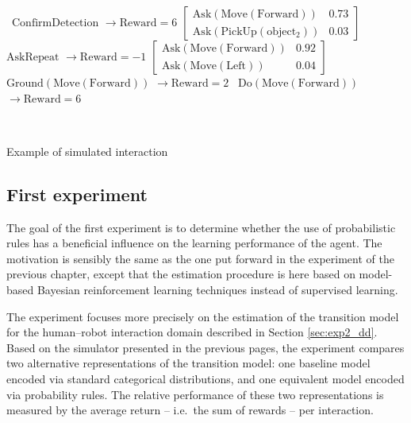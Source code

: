 \begin{Transcript}[p!]
\begin{normalsize}
\begin{dialogue}
 \ $\mathrm{ConfirmDetection}$ \hspace{34mm} $\rightarrow \mathrm{Reward} = 6$ \vspace{3mm}
 $\begin{bmatrix}\mathrm{Ask(Move(Forward))} & 0.73 \\
\mathrm{Ask(PickUp(object_2))}& 0.03 \end{bmatrix}$ \vspace{3mm}
 \ $\mathrm{AskRepeat}$ \hspace{47mm} $\rightarrow \mathrm{Reward} = -1$ \vspace{3mm}
 $\begin{bmatrix}\mathrm{Ask(Move(Forward))} & 0.92 \\
\mathrm{Ask(Move(Left))} & 0.04 \end{bmatrix}$ \vspace{3mm}
 \ $\mathrm{Ground(Move(Forward))}$ \hspace{22mm} $\rightarrow \mathrm{Reward} = 2$ \vspace{3mm}
 \ $\mathrm{Do(Move(Forward))}$ \hspace{31mm} $\rightarrow \mathrm{Reward} = 6$
\end{dialogue}
$\phantom{a}$\hspace{13mm} \vspace{3mm}
\end{normalsize}
\caption{Example of simulated interaction}
\end{Transcript}

\subsection{First experiment}

The goal of the first experiment is to determine whether the use of probabilistic rules has a beneficial influence on the learning performance of the agent. The motivation is sensibly the same as the one put forward in the experiment of the previous chapter, except that the estimation procedure is here based on model-based Bayesian reinforcement learning techniques instead of supervised learning. 

The experiment focuses more precisely on the estimation of the transition model for the human--robot interaction domain described in Section \ref{sec:exp2_dd}. Based on the simulator presented in the previous pages, the experiment compares two alternative representations of the transition model: one baseline model encoded via standard categorical distributions, and one equivalent model encoded via probability rules.  The relative performance of these two representations is measured by the average return -- i.e.\ the sum of rewards -- per interaction. 


